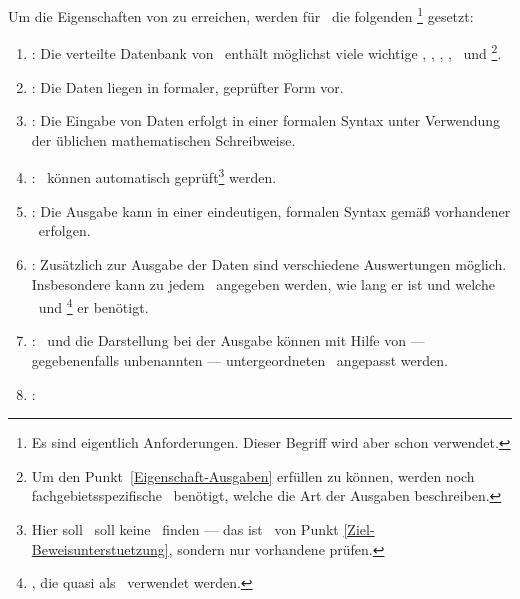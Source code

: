 \section[Ziele]{\Ziele}%
\beginsection  {\Ziele}
\label      {sec-Ziele}

Um die Eigenschaften von  zu erreichen, werden für \ASBA\ die folgenden \Ziele%
\footnote{%
	Es sind eigentlich Anforderungen.
	Dieser Begriff wird aber schon  verwendet.
}
gesetzt:
\begin{enumerate}
	\item \label{Ziel-Daten} :
	Die verteilte Datenbank von \ASBA\ enthält möglichst viele wichtige \Axiome, \Saetze, \Beweise, \Fachbegriffe, \Fachgebiete\ und \Ausgabeschemata%
	\footnote{%
		Um den Punkt~\ref{Eigenschaft-Ausgaben}  erfüllen zu können, werden noch fachgebietsspezifische \Ausgabeschemata\ benötigt, welche die Art der Ausgaben beschreiben.
	}.
	\item \label{Ziel-Form} :
	Die Daten liegen in formaler, geprüfter Form vor.
	\item \label{Ziel-Eingaben} :
	Die Eingabe von Daten erfolgt in einer formalen Syntax unter Verwendung der üblichen mathematischen Schreibweise.
	\item \label{Ziel-Pruefung} :
	\Beweise\ können automatisch geprüft\footnote{%
		Hier soll \ASBA\ soll keine \Beweise\ finden --- das ist \Ziel\ von Punkt \ref{Ziel-Beweisunterstuetzung}, sondern nur vorhandene prüfen.
	}
	werden.
	\item \label{Ziel-Ausgaben} :
	Die Ausgabe kann in einer eindeutigen, formalen Syntax gemäß vorhandener \Ausgabeschemata\ erfolgen.
	\item \label{Ziel-Auswertungen} :
	Zusätzlich zur Ausgabe der Daten sind verschiedene Auswertungen möglich.
	Insbesondere kann zu jedem \Beweis\ angegeben werden, wie lang er ist und welche \Axiome\ und \Saetze%
	\footnote{%
		\Saetze, die quasi als \Axiome\ verwendet werden.
	}
	er benötigt.
	\item \label{Ziel-Anpassbarkeit} :
	\Fachbegriffe\ und die Darstellung bei der Ausgabe können mit Hilfe von --- gegebenenfalls unbenannten --- untergeordneten \Fachgebieten\ angepasst werden.
	\item \label{Ziel-Individualitaet} :

\end{enumerate}
